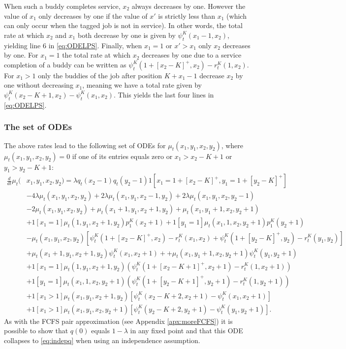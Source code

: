\documentclass[acmsmall,nonacm]{acmart}
\begin{document}
When such a buddy completes service, $x_2$ always decreases by one.
However the value of $x_1$ only decreases by one if the value of $x'$ is strictly less
than $x_1$ (which can only occur when the tagged job is not in service). 
In other words, the total rate at which $x_2$ and $x_1$ both decrease by one is given by
$\psi^K_t(x_1-1,x_2)$, yielding line $6$ in \eqref{eq:ODELPS}.
Finally, when $x_1=1$ or $x' > x_1$ only $x_2$ decreases by one. For $x_1=1$ the total rate
at which  $x_2$ decreases by one due to a service completion of a buddy
can be written as $\psi_t^K(1+[x_2-K]^+,x_2)-r_t^K(1,x_2)$. 
For $x_1 > 1$ only the buddies of the job after position $K+x_1-1$ decrease $x_2$ by
one without decreasing $x_1$, meaning we have a total rate given by
$\psi_t^K(x_2-K+1,x_2)-\psi_t^K(x_1,x_2)$. This yields the last four lines in \eqref{eq:ODELPS}.


\subsubsection{The set of ODEs}
The above rates lead to the following set of ODEs for $\mu_t(x_1,y_1,x_2,y_2)$, where
$\mu_t(x_1,y_1,x_2,y_2)=0$ if one of its entries equals zero or $x_1 > x_2 - K+1$ or $y_1 > y_2-K+1$:
\begin{align}\label{eq:ODELPS}
    \frac{d}{dt} \mu_t(&x_1,y_1,x_2,y_2)= \lambda q_t(x_2-1) q_t(y_2-1) 
    1[x_1=1+[x_2-K]^+, y_1=1+[y_2-K]^+]\nonumber \\&
    - 4\lambda \mu_t(x_1,y_1,x_2,y_2) +2\lambda\mu_t(x_1,y_1,x_2-1,y_2) + 2\lambda \mu_t(x_1,y_1,x_2,y_2-1) \nonumber\\
    &-2\mu_t(x_1,y_1,x_2,y_2) +\mu_t(x_1+1,y_1,x_2+1,y_2) + \mu_t(x_1,y_1+1,x_2,y_2+1)
    \nonumber \\
    &+1[x_1=1]\mu_t(1,y_1,x_2+1,y_2) p_1^K(x_2+1) 
    +1[y_1=1]\mu_t(x_1,1,x_2,y_2+1) p_1^K(y_2+1) \nonumber \\ 
    &-\mu_t(x_1,y_1,x_2,y_2) 
    \left[\psi^K_t(1+[x_2-K]^+,x_2) - r_t^K(x_1,x_2) + \psi^K_t(1+[y_2-K]^+,y_2) - r_t^K(y_1,y_2)\right] 
    \nonumber \\ 
    & +\mu_t(x_1+1,y_1,x_2+1,y_2) \psi^K_t(x_1,x_2+1) +
     +\mu_t(x_1,y_1+1,x_2,y_2+1) \psi^K_t(y_1,y_2+1) 
  \nonumber \\
    &+1[x_1=1] \mu_t(1,y_1,x_2+1,y_2) (\psi_t^K(1+[x_2-K+1]^+,x_2+1)-r_t^K(1,x_2+1))
    \nonumber \\
    &+1[y_1=1] \mu_t(x_1,1,x_2,y_2+1) (\psi_t^K(1+[y_2-K+1]^+,y_2+1)-r_t^K(1,y_2+1))
    \nonumber \\
    &+1[x_1 > 1]\mu_t(x_1,y_1,x_2+1,y_2) 
    \left[\psi^K_t(x_2-K+2,x_2+1) -\psi^K_t(x_1,x_2+1) \right] \nonumber \\
    &+1[x_1 > 1]\mu_t(x_1,y_1,x_2,y_2+1) 
    \left[\psi^K_t(y_2-K+2,y_2+1) -\psi^K_t(y_1,y_2+1) \right].
\end{align}
As with the FCFS pair approximation (see Appendix \ref{apx:moreFCFS}) it is possible to show that $q(0)$ equals $1-\lambda$ in any fixed
point and that this ODE collapses to \eqref{eq:indepq} when using an independence assumption.
\end{document}
